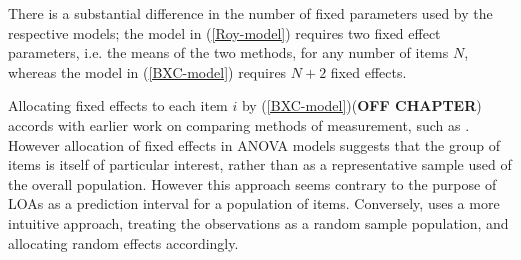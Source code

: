 \documentclass[12pt, a4paper]{report}
\theoremstyle{plain}
\theoremstyle{definition}
\theoremstyle{remark}
\begin{document}
	
	
	There is a substantial difference in the number of fixed parameters used by the respective models; the model in (\ref{Roy-model}) requires two fixed effect parameters, i.e. the means of the two methods, for any number of items $N$, whereas the model in (\ref{BXC-model}) requires $N+2$ fixed effects.
	
	Allocating fixed effects to each item $i$ by (\ref{BXC-model})(\textbf{OFF CHAPTER}) accords with earlier work on comparing methods of measurement, such as \citet{Grubbs48}. However allocation of fixed effects in ANOVA models suggests that the group of items is itself of particular interest, rather than as a representative sample used of the overall population. However this approach seems contrary to the purpose of LOAs as a prediction interval for a population of items. Conversely, \citet{ARoy2009}
	uses a more intuitive approach, treating the observations as a random sample population, and allocating random effects accordingly.
	
	
	
	
	
	
	
	
	
	
	
	
	
	
	
	
	
	
	
	
	
	
\end{document}
